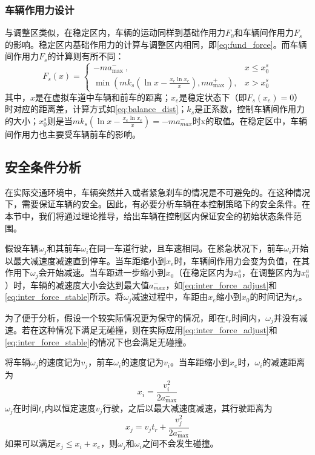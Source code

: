 \subsubsection{车辆作用力设计}
与调整区类似，在稳定区内，车辆的运动同样到基础作用力$F_0$和车辆间作用力$F_s$的影响。稳定区内基础作用力的计算与调整区内相同，即\ref{eq:fund_force}。而车辆间作用力$F_s$的计算则有所不同：
\begin{equation}
    F_{s}(x)=\left\{
    \begin{array}{cc}
        -m a_{\text {max }}^{-},                                                                      & x \leq x_{0}^{s} \\
        \min \left(m k_{s}\left(\ln{x}-\frac{x_{e}\ln{x_e}}{x}\right), m a_{\text {max }}^{+}\right), & x>x_{0}^{s}
    \end{array}
    \right.
    \label{eq:inter_force_stable}
\end{equation}
其中，$x$是在虚拟车道中车辆和前车的距离；$x_e$是稳定状态下（即$F_s(x_e)=0$）时对应的距离差，计算方式如\ref{eq:balance_dist}；$k_s$是正系数，控制车辆间作用力的大小；$x_0^s$则是当$mk_s(\ln{x}-\frac{x_e\ln{x_e}}{x})=-ma_{max}^-$时x的取值。在稳定区中，车辆间作用力也主要受车辆前车的影响。

\subsection{安全条件分析}
在实际交通环境中，车辆突然并入或者紧急刹车的情况是不可避免的。在这种情况下，需要保证车辆的安全。因此，有必要分析车辆在本控制策略下的安全条件。在本节中，我们将通过理论推导，给出车辆在控制区内保证安全的初始状态条件范围。

假设车辆$\omega_j$和其前车$\omega_i$在同一车道行驶，且车速相同。在紧急状况下，前车$\omega_i$开始以最大减速度减速直到停车。当车距缩小到$x_e$时，车辆间作用力会变为负值，在其作用下$\omega_j$会开始减速。当车距进一步缩小到$x_0$（在稳定区内为$x_0^s$，在调整区内为$x_0^a$）时，车辆的减速度大小会达到最大值$a_{max}^-$，如\ref{eq:inter_force_adjust}和\ref{eq:inter_force_stable}所示。将$\omega_j$减速过程中，车距由$x_e$缩小到$x_0$的时间记为$t_{r}$。

为了便于分析，假设一个较实际情况更为保守的情况，即在$t_{r}$时间内，$\omega_j$并没有减速。若在这种情况下满足无碰撞，则在实际应用\ref{eq:inter_force_adjust}和\ref{eq:inter_force_stable}的情况下也会满足无碰撞。

将车辆$\omega_j$的速度记为$v_j$，前车$\omega_i$的速度记为$v_i$。当车距缩小到$x_e$时，$\omega_i$的减速距离为
\begin{equation}
    x_{i}=\frac{v_{i}^{2}}{2 a_{\max }^{-}}
    \label{eq:decel_dist_i}
\end{equation}
$\omega_j$在时间$t_r$内以恒定速度$v_j$行驶，之后以最大减速度减速，其行驶距离为
\begin{equation}
    x_{j}=v_{j} t_{r}+\frac{v_{j}^{2}}{2 a_{\max }^{-}}
    \label{eq:decel_dist_j}
\end{equation}
如果可以满足$x_j\leq x_i + x_e$，则$\omega_j$和$\omega_i$之间不会发生碰撞。

